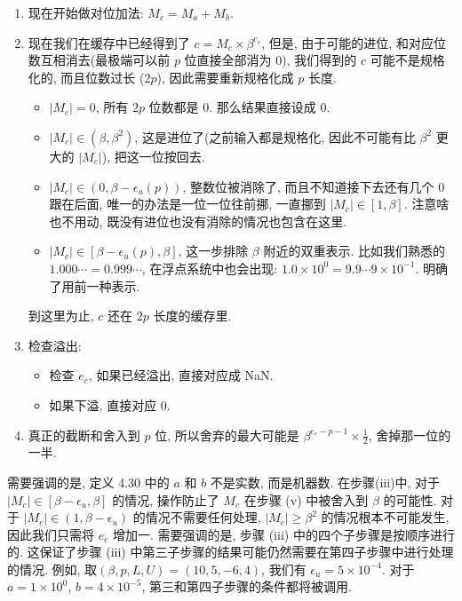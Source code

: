 \documentclass[a4paper]{ctexart}
\begin{document}
\begin{enumerate}
\begin{itemize}
  \end{itemize}
\item 现在开始做对位加法: $M_c = M_a + M_b$. 
\item 现在我们在缓存中已经得到了 $c = M_c \times \beta^{e_c}$,
  但是, 由于可能的进位, 和对应位数互相消去(最极端可以前 $p$ 位直接全部消为 $0$),
  我们得到的 $c$ 可能不是规格化的, 而且位数过长 ($2 p$),
  因此需要重新规格化成 $p$ 长度.
  \begin{itemize}
  \item $|M_c| = 0$, 所有 $2 p$ 位数都是 $0$. 那么结果直接设成 $0$.
  \item $|M_c| \in (\beta, \beta^2)$, 这是进位了(之前输入都是规格化,
    因此不可能有比 $\beta^2$ 更大的 $|M_c|$), 把这一位按回去.
  \item $|M_c| \in (0, \beta - \epsilon_u(p))$, 整数位被消除了,
    而且不知道接下去还有几个 $0$ 跟在后面, 唯一的办法是一位一位往前挪,
    一直挪到 $|M_c| \in [1, \beta]$.
    注意啥也不用动, 既没有进位也没有消除的情况也包含在这里. 
  \item $|M_c| \in [\beta - \epsilon_u(p), \beta]$, 这一步排除 $\beta$
    附近的双重表示. 比如我们熟悉的 $1.000 \cdots = 0.999 \cdots$,
    在浮点系统中也会出现: $1.0 \times 10^0 = 9.9\cdots 9 \times 10^{-1}$.
    明确了用前一种表示.
  \end{itemize}
  到这里为止, $c$ 还在 $2 p$ 长度的缓存里. 
\item 检查溢出:
  \begin{itemize}
  \item 检查 $e_c$, 如果已经溢出, 直接对应成 NaN.
  \item 如果下溢, 直接对应 $0$.
  \end{itemize}
\item 真正的截断和舍入到 $p$ 位,
  所以舍弃的最大可能是 $\beta^{e_c - p - 1} \times \frac{1}{2}$,
  舍掉那一位的一半.
\end{enumerate}

\begin{remark}
  需要强调的是, 定义 4.30 中的 $a$ 和 $b$ 不是实数, 而是机器数. 在步骤(iii)中, 
  对于 $|M_c | \in [\beta - \epsilon_u, \beta]$ 的情况, 操作防止了
  $M_c$ 在步骤 (v) 中被舍入到 $\beta$ 的可能性. 对于 $|M_c| \in (1, \beta - \epsilon_u)$ 
  的情况不需要任何处理, $|M_c | \geq \beta^2$ 的情况根本不可能发生, 
  因此我们只需将 $e_c$ 增加一. 需要强调的是, 步骤 (iii) 中的四个子步骤是按顺序进行的. 
  这保证了步骤 (iii) 中第三子步骤的结果可能仍然需要在第四子步骤中进行处理的情况. 
  例如, 取$(\beta, p, L, U ) = (10, 5, -6, 4)$, 我们有
  $\epsilon_u = 5 \times 10^{-4}$. 对于$a = 1 \times 10^0$, 
  $b = 4 \times 10^{-5}$, 第三和第四子步骤的条件都将被调用.
\end{remark}
\end{document}
